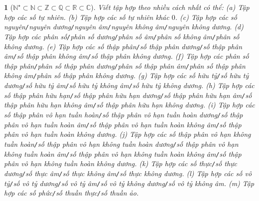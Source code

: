 \documentclass{article}
\newtheorem{baitoan}{}
\begin{document}
\begin{baitoan}[$\mathbb{N}^\star\subset\mathbb{N}\subset\mathbb{Z}\subset\mathbb{Q}\subset\mathbb{R}\subset\mathbb{C}$]
	Viết tập hợp theo nhiều cách nhất có thể: (a) Tập hợp các số tự nhiên. (b) Tập hợp các số tự nhiên khác $0$. (c) Tập hợp các số nguyên{\tt/}nguyên dương{\tt/}nguyên âm{\tt/}nguyên không âm{\tt/}nguyên không dương. (d) Tập hợp các phân số{\tt/}phân số dương{\tt/}phân số âm{\tt/}phân số không âm{\tt/}phân số không dương. (e) Tập hợp các số thập phân{\tt/}số thập phân dương{\tt/}số thập phân âm{\tt/}số thập phân không âm{\tt/}số thập phân không dương. (f) Tập hợp các phân số thập phân{\tt/}phân số thập phân dương{\tt/}phân số thập phân âm{\tt/}phân số thập phân không âm{\tt/}phân số thập phân không dương. (g) Tập hợp các số hữu tỷ{\tt/}số hữu tỷ dương{\tt/}số hữu tỷ âm{\tt/}số hữu tỷ không âm{\tt/}số hữu tỷ không dương. (h) Tập hợp các số thập phân hữu hạn{\tt/}số thập phân hữu hạn dương{\tt/}số thập phân hữu hạn âm{\tt/}số thập phân hữu hạn không âm{\tt/}số thập phân hữu hạn không dương. (i) Tập hợp các số thập phân vô hạn tuần hoàn{\tt/}số thập phân vô hạn tuần hoàn dương{\tt/}số thập phân vô hạn tuần hoàn âm{\tt/}số thập phân vô hạn tuần hoàn không âm{\tt/}số thập phân vô hạn tuần hoàn không dương. (j) Tập hợp các số thập phân vô hạn không tuần hoàn{\tt/}số thập phân vô hạn không tuần hoàn dương{\tt/}số thập phân vô hạn không tuần hoàn âm{\tt/}số thập phân vô hạn không tuần hoàn không âm{\tt/}số thập phân vô hạn không tuần hoàn không dương.  (k) Tập hợp các số thực{\tt/}số thực dương{\tt/}số thực âm{\tt/}số thực không âm{\tt/}số thực không dương. (l) Tập hợp các số vô tỷ{\tt/}số vô tỷ dương{\tt/}số vô tỷ âm{\tt/}số vô tỷ không dương{\tt/}số vô tỷ không âm. (m) Tập hợp các số phức{\tt/}số thuần thực{\tt/}số thuần ảo.
\end{baitoan}


\printbibliography[heading=bibintoc]
\end{document}
